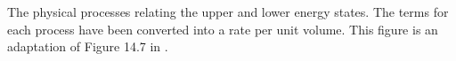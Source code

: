 \label{fig:energy_diagram} The physical processes relating the upper and lower energy states. The terms for each process have been converted into a rate per unit volume. This figure is an adaptation of Figure 14.7 in \citet{stahler_palla_2004}.
